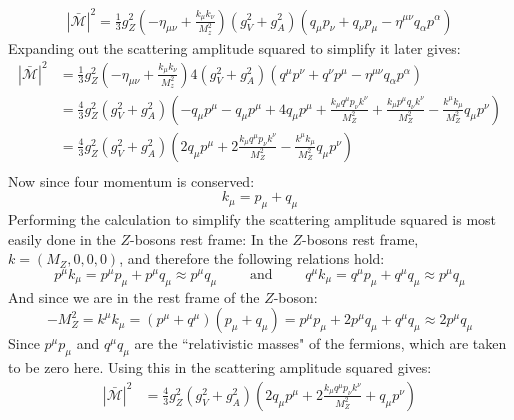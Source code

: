 \documentclass[12pt,a4]{article}
\begin{document}
\begin{enumerate}
\begin{enumerate}
\begin{align*}
          |\bar{\mathcal{M}}|^2 = \frac{1}{3} g_Z^2 \left(-\eta_{\mu\nu} + \frac{k_\mu k_\nu }{M_z^2}\right) (g_V^2 + g_A^2)\left( q_\mu p_\nu +  q_\nu p_\mu - \eta^{\mu\nu}  q_\alpha p^\alpha\right)
        \end{align*}
        Expanding out the scattering amplitude squared to simplify it later gives:
        \begin{align*}
          |\bar{\mathcal{M}}|^2 &= \frac{1}{3} g_Z^2 \left(-\eta_{\mu\nu} + \frac{k_\mu k_\nu }{M_z^2}\right) 4 (g_V^2 + g_A^2)\left( q^\mu p^\nu +  q^\nu p^\mu - \eta^{\mu\nu}  q_\alpha p^\alpha\right)\\
                                &= \frac{4}{3} g_Z^2  (g_V^2 + g_A^2)\left( -q_\mu p^\mu - q_\mu p^\mu + 4  q_\mu p^\mu + \frac{k_\mu q^\mu p_\nu k^\nu}{M_Z^2} + \frac{k_\mu p^\mu q_\nu k^\nu}{M_Z^2} - \frac{k^\mu k_\mu}{M_Z^2} q_\mu p^\nu\right)\\
                                &= \frac{4}{3} g_Z^2  (g_V^2 + g_A^2)\left( 2  q_\mu p^\mu + 2 \frac{k_\mu q^\mu p_\nu k^\nu}{M_Z^2} - \frac{k^\mu k_\mu}{M_Z^2} q_\mu p^\nu\right)\\
        \end{align*}
        Now since four momentum is conserved:
        \begin{equation*}
          k_\mu = p_\mu + q_\mu
        \end{equation*}
        Performing the calculation to simplify the scattering amplitude squared is most easily done in the $Z$-bosons rest frame:
        In the $Z$-bosons rest frame, $k = (M_Z, 0, 0, 0)$, and therefore the following relations hold:
        \begin{equation*}
          p^\mu k_\mu = p^\mu p_\mu + p^\mu q_\mu \approx p^\mu q_\mu \qquad \text{ and } \qquad q^\mu k_\mu = q^\mu p_\mu + q^\mu q_\mu \approx p^\mu q_\mu
        \end{equation*}
        And since we are in the rest frame of the $Z$-boson:
        \begin{equation*}
          - M_Z^2 =  k^\mu k_\mu = (p^\mu + q^\mu) (p_\mu + q_\mu) = p^\mu p_\mu + 2 p^\mu q_\mu + q^\mu q_\mu \approx 2 p^\mu q_\mu
        \end{equation*}
        Since $p^\mu p_\mu$ and $q^\mu q_\mu$ are the ``relativistic masses" of the fermions, which are taken to be zero here.
        Using this in the scattering amplitude squared gives:
        \begin{align*}
          |\bar{\mathcal{M}}|^2 &= \frac{4}{3} g_Z^2  (g_V^2 + g_A^2)\left( 2  q_\mu p^\mu + 2 \frac{k_\mu q^\mu p_\nu k^\nu}{M_Z^2} + q_\mu p^\nu\right)\\

\end{align*}
\end{enumerate}
\end{enumerate}
\end{document}
